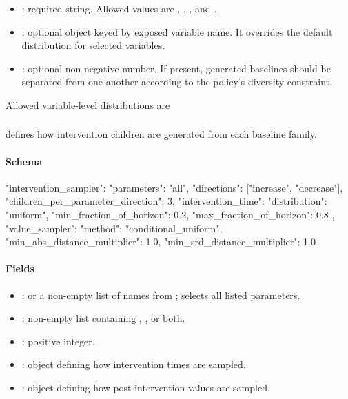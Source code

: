 \documentclass[11pt]{article}
\begin{document}
\begin{itemize}
\item {}: required string. Allowed values are , , , and .
\item {}: optional object keyed by exposed variable name. It overrides the default distribution for selected variables.
\item {}: optional non-negative number. If present, generated baselines should be separated from one another according to the policy's diversity constraint.
\end{itemize}

Allowed variable-level distributions are 

\subsubsection*{\texorpdfstring{}{intervention\_sampler}}

 defines how intervention children are generated from each baseline family.

\paragraph{Schema}

\begin{DocCode}
"intervention_sampler": {
  "parameters": "all",
  "directions": ["increase", "decrease"],
  "children_per_parameter_direction": 3,
  "intervention_time": {
    "distribution": "uniform",
    "min_fraction_of_horizon": 0.2,
    "max_fraction_of_horizon": 0.8
  },
  "value_sampler": {
    "method": "conditional_uniform",
    "min_abs_distance_multiplier": 1.0,
    "min_srd_distance_multiplier": 1.0
  }
}
\end{DocCode}

\paragraph{Fields}

\begin{itemize}
\item {}:  or a non-empty list of names from ;  selects all listed parameters.
\item {}: non-empty list containing , , or both.
\item {}: positive integer.
\item {}: object defining how intervention times are sampled.
\item {}: object defining how post-intervention values are sampled.
\end{itemize}
\end{document}
